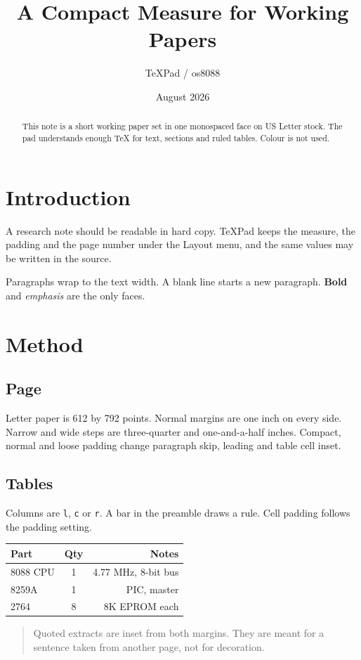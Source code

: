 \documentclass[letterpaper,12pt]{article}
\title{A Compact Measure for Working Papers}
\author{TeXPad / os8088}
\date{August 2026}
\begin{document}
\maketitle

\begin{abstract}
This note is a short working paper set in one monospaced face on
US Letter stock. The pad understands enough TeX for text, sections
and ruled tables. Colour is not used.
\end{abstract}

\section{Introduction}
A research note should be readable in hard copy. TeXPad keeps the
measure, the padding and the page number under the Layout menu, and
the same values may be written in the source.

Paragraphs wrap to the text width. A blank line starts a new
paragraph. \textbf{Bold} and \emph{emphasis} are the only faces.

\section{Method}
\subsection{Page}
Letter paper is 612 by 792 points. Normal margins are one inch on
every side. Narrow and wide steps are three-quarter and one-and-a-half
inches. Compact, normal and loose padding change paragraph skip,
leading and table cell inset.

\subsection{Tables}
Columns are \texttt{l}, \texttt{c} or \texttt{r}. A bar in the
preamble draws a rule. Cell padding follows the padding setting.

\begin{tabular}{|l|c|r|}
\hline
Part & Qty & Notes \\
\hline
8088 CPU & 1 & 4.77 MHz, 8-bit bus \\
8259A & 1 & PIC, master \\
2764 & 8 & 8K EPROM each \\
\hline
\end{tabular}

\begin{quote}
Quoted extracts are inset from both margins. They are meant for a
sentence taken from another page, not for decoration.
\end{quote}
\end{document}
